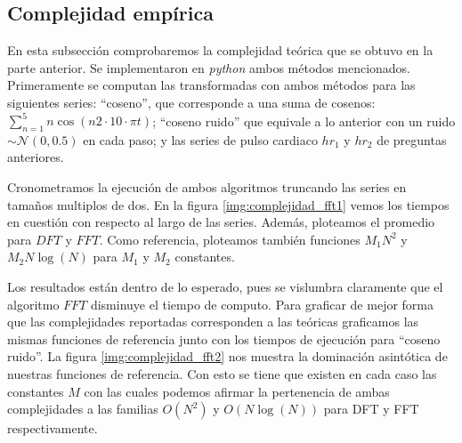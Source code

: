 \documentclass[letterpaper,11pt,oneside]{article}
\theoremstyle{break}
\begin{document}
\newpage
\subsection{Complejidad empírica}
En esta subsección comprobaremos la complejidad teórica que se obtuvo en la parte anterior. Se implementaron en \textit{python} ambos métodos mencionados.  %
Primeramente se computan las transformadas con ambos métodos para las siguientes series: ``coseno'', que corresponde a una suma de cosenos: $\sum^5_{n=1}n\cos(n 2\cdot 10\cdot \pi t)$; ``coseno ruido'' que equivale a lo anterior con un ruido $\sim\mathcal{N}(0,0.5)$ en cada paso; y las series de pulso cardiaco $hr_1$ y $hr_2$ de preguntas anteriores.

\newp Cronometramos la ejecución de ambos algoritmos truncando las series en tamaños multiplos de dos. En la figura \ref{img:complejidad_fft1} vemos los tiempos en cuestión con respecto al largo de las series. Además, ploteamos el promedio para $DFT$ y $FFT$. Como referencia, ploteamos también funciones $M_1 N^2$ y $M_2 N\log(N)$ para $M_1$ y $M_2$ constantes.



Los resultados están dentro de lo esperado, pues se vislumbra claramente que el algoritmo $FFT$ disminuye el tiempo de computo. Para graficar de mejor forma que las complejidades reportadas corresponden a las teóricas graficamos las mismas funciones de referencia junto con los tiempos de ejecución para ``coseno ruido''. La figura \ref{img:complejidad_fft2} nos muestra la dominación asintótica de nuestras funciones de referencia. Con esto se tiene que existen en cada caso las constantes $M$ con las cuales podemos afirmar la pertenencia de ambas complejidades a las familias $O(N^2)$ y $O(N\log(N))$ para DFT y FFT respectivamente.



\end{document}
